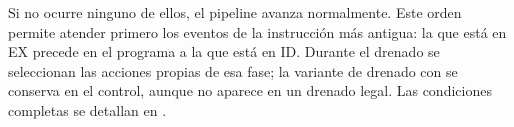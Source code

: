 Si no ocurre ninguno de ellos, el pipeline avanza normalmente. Este orden
permite atender primero los eventos de la instrucción más antigua: la que está
en EX precede en el programa a la que está en ID. Durante el drenado se
seleccionan las acciones propias de esa fase; la variante de drenado con
 se conserva en el control, aunque no aparece en un drenado
legal. Las condiciones completas se detallan en
.
